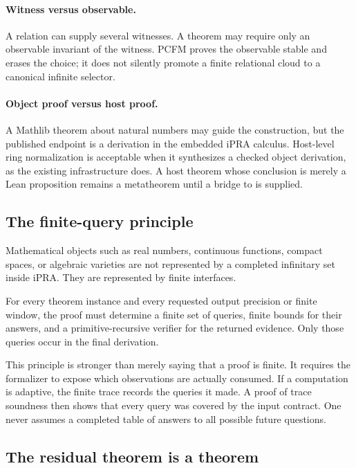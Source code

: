 \paragraph{Witness versus observable.}
A relation can supply several witnesses.  A theorem may require only an
observable invariant of the witness.  PCFM proves the observable stable and
erases the choice; it does not silently promote a finite relational cloud to a
canonical infinite selector.

\paragraph{Object proof versus host proof.}
A Mathlib theorem about natural numbers may guide the construction, but the
published endpoint is a derivation in the embedded iPRA calculus.  Host-level
ring normalization is acceptable when it synthesizes a checked object
derivation, as the existing  infrastructure does.  A host
theorem whose conclusion is merely a Lean proposition remains a metatheorem
until a bridge to  is supplied.

\subsection{The finite-query principle}

Mathematical objects such as real numbers, continuous functions, compact
spaces, or algebraic varieties are not represented by a completed infinitary
set inside iPRA.  They are represented by finite interfaces.

\begin{principle}
For every theorem instance and every requested output precision or finite
window, the proof must determine a finite set of queries, finite bounds for
their answers, and a primitive-recursive verifier for the returned evidence.
Only those queries occur in the final derivation.
\end{principle}

This principle is stronger than merely saying that a proof is finite.  It
requires the formalizer to expose which observations are actually consumed.
If a computation is adaptive, the finite trace records the queries it made.
A proof of trace soundness then shows that every query was covered by the input
contract.  One never assumes a completed table of answers to all possible
future questions.

\subsection{The residual theorem is a theorem}


